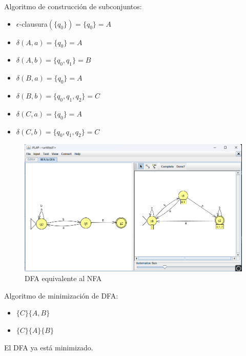 \documentclass[11pt]{report}
\begin{document}
Algoritmo de construcción de subconjuntos:
\begin{multicols}{2}
  \begin{itemize}
    \item $\epsilon$-clausura$(\{q_0\}) = \{q_0\} = A$
    \item $\delta(A, a) = \{q_0\} = A$
    \item $\delta(A, b) = \{q_0, q_1\} = B$
    \item $\delta(B, a) = \{q_0\} = A$
  \end{itemize}

  \columnbreak

  \begin{itemize}
    \item $\delta(B, b) = \{q_0, q_1, q_2\} = C$
    \item $\delta(C, a) = \{q_0\} = A$
    \item $\delta(C, b) = \{q_0, q_1, q_2\} = C$ 
  \end{itemize}
\end{multicols}

\begin{figure}[H]
  \centering
  \includegraphics[scale=0.45]{img/NFA_to_DFA_02.png}
  \caption{DFA equivalente al NFA}
\end{figure}

Algoritmo de minimización de DFA:
\begin{itemize}
  \item $\{C\} \{A, B\}$
  \item $\{C\} \{A\} \{B\}$
\end{itemize}

El DFA ya está minimizado.
\end{document}
